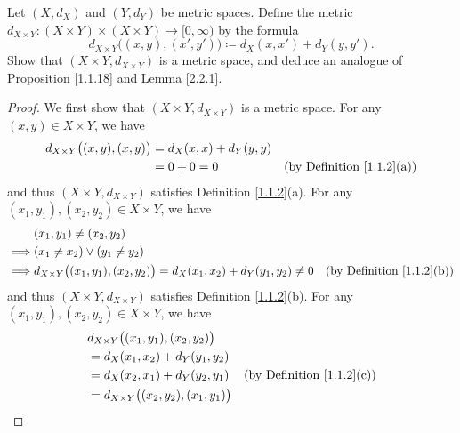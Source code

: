 \begin{exercise}\label{ex 2.2.8}
    Let \((X, d_X)\) and \((Y, d_Y)\) be metric spaces.
    Define the metric \(d_{X \times Y} : (X \times Y) \times (X \times Y) \to [0, \infty)\) by the formula
    \[
        d_{X \times Y}\big((x, y), (x', y')\big) \coloneqq d_X(x, x') + d_Y(y, y').
    \]
    Show that \((X \times Y, d_{X \times Y})\) is a metric space, and deduce an analogue of Proposition \ref{1.1.18} and Lemma \ref{2.2.1}.
\end{exercise}

\begin{proof}
    We first show that \((X \times Y, d_{X \times Y})\) is a metric space.
    For any \((x, y) \in X \times Y\), we have
    \begin{align*}
        d_{X \times Y}\big((x, y), (x, y)\big) & = d_X(x, x) + d_Y(y, y)                                         \\
                                               & = 0 + 0 = 0             & \text{(by Definition \ref{1.1.2}(a))}
    \end{align*}
    and thus \((X \times Y, d_{X \times Y})\) satisfies Definition \ref{1.1.2}(a).
    For any \((x_1, y_1), (x_2, y_2) \in X \times Y\), we have
    \begin{align*}
                 & (x_1, y_1) \neq (x_2, y_2)                                                                                                    \\
        \implies & (x_1 \neq x_2) \lor (y_1 \neq y_2)                                                                                            \\
        \implies & d_{X \times Y}\big((x_1, y_1), (x_2, y_2)\big) = d_X(x_1, x_2) + d_Y(y_1, y_2) \neq 0 & \text{(by Definition \ref{1.1.2}(b))}
    \end{align*}
    and thus \((X \times Y, d_{X \times Y})\) satisfies Definition \ref{1.1.2}(b).
    For any \((x_1, y_1), (x_2, y_2) \in X \times Y\), we have
    \begin{align*}
         & d_{X \times Y}\big((x_1, y_1), (x_2, y_2)\big)                                           \\
         & = d_X(x_1, x_2) + d_Y(y_1, y_2)                                                          \\
         & = d_X(x_2, x_1) + d_Y(y_2, y_1)                  & \text{(by Definition \ref{1.1.2}(c))} \\
         & = d_{X \times Y}\big((x_2, y_2), (x_1, y_1)\big)

\end{align*}
\end{proof}
